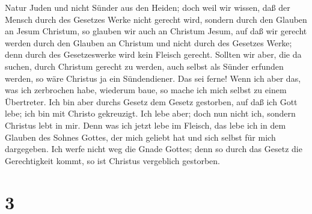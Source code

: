 Natur Juden und nicht Sünder aus den Heiden;  doch weil wir
wissen, daß der Mensch durch des Gesetzes Werke nicht gerecht wird,
sondern durch den Glauben an Jesum Christum, so glauben wir auch an
Christum Jesum, auf daß wir gerecht werden durch den Glauben an Christum
und nicht durch des Gesetzes Werke; denn durch des Gesetzeswerke wird
kein Fleisch gerecht.  Sollten wir aber, die da suchen,
durch Christum gerecht zu werden, auch selbst als Sünder erfunden
werden, so wäre Christus ja ein Sündendiener. Das sei ferne!
 Wenn ich aber das, was ich zerbrochen habe, wiederum baue,
so mache ich mich selbst zu einem Übertreter.  Ich bin aber
durchs Gesetz dem Gesetz gestorben, auf daß ich Gott lebe; ich bin mit
Christo gekreuzigt.  Ich lebe aber; doch nun nicht ich,
sondern Christus lebt in mir. Denn was ich jetzt lebe im Fleisch, das
lebe ich in dem Glauben des Sohnes Gottes, der mich geliebt hat und sich
selbst für mich dargegeben.  Ich werfe nicht weg die Gnade
Gottes; denn so durch das Gesetz die Gerechtigkeit kommt, so ist
Christus vergeblich gestorben.

\hypertarget{section-2}{%
\section{3}\label{section-2}}

